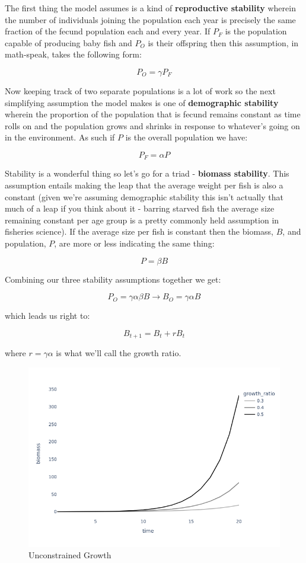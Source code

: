 \documentclass[11pt,a5paper]{book}
\begin{document}
The first thing the model assumes is a kind of \textbf{reproductive stability} wherein the number of individuals joining the population each year is precisely the same fraction of the fecund population each and every year. If $P_F$ is the population capable of producing baby fish and $P_O$ is their offspring then this assumption, in math-speak, takes the following form:

$$P_O = \gamma P_F$$

Now keeping track of two separate populations is a lot of work so the next simplifying assumption the model makes is one of \textbf{demographic stability} wherein the proportion of the population that is fecund remains constant as time rolls on and the population grows and shrinks in response to whatever's going on in the environment. As such if $P$ is the overall population we have:

$$P_F = \alpha P$$

Stability is a wonderful thing so let's go for a triad - \textbf{biomass stability}. This assumption entails making the leap that the average weight per fish is also a constant (given we're assuming demographic stability this isn't actually that much of a leap if you think about it - barring starved fish the average size remaining constant per age group is a pretty commonly held assumption in fisheries science). If the average size per fish is constant then the biomass, $B$, and population, $P$, are more or less indicating the same thing:

$$P = \beta B$$

Combining our three stability assumptions together we get:

$$P_O = \gamma \alpha \beta B \rightarrow B_O = \gamma \alpha B $$

which leads us right to:

$$B_{t+1} = B_{t} + rB_t$$

where $r=\gamma \alpha$ is what we'll call the growth ratio. 
\newline

\begin{figure}[h!] 
  \includegraphics[width=\linewidth]{notebooks/SurplusModels/exponential_growth.png}
  \caption{Unconstrained Growth}
  \label{fig:unconstrained_growth}
\end{figure}
\end{document}
